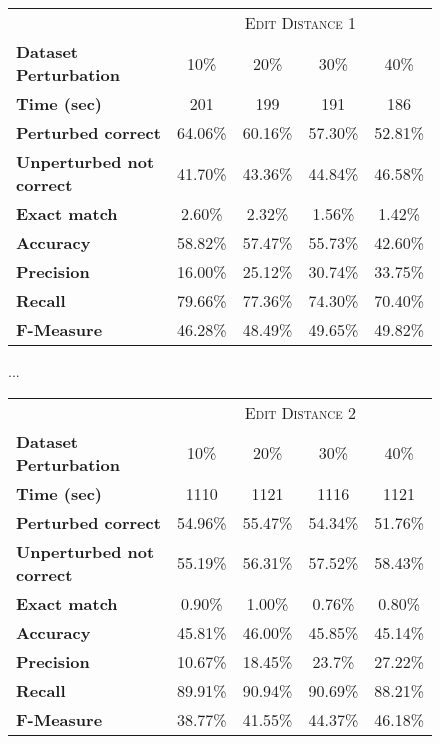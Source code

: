 \begin{figure}[H]
	\centering
	\begin{tabular}{lcccc}
		\toprule
		&\multicolumn{4}{c}{\textsc{Edit Distance 1}} \\
		\textbf{Dataset Perturbation} & \num{10}\%& \num{20}\% & \num{30}\%& \num{40}\%  \\
		\midrule
		\textbf{Time (sec)}							 &\num{201}			&\num{199}			& \num{191}			&\num{186} \\
		\textbf{Perturbed correct} 			   & \num{64,06}\% &\num{60,16}\%  & \num{57,30}\%	& \num{52,81}\% \\
		\textbf{Unperturbed not correct} &\num{41,70}\%	 &\num{43,36}\%  & \num{44,84}\% & \num{46,58}\% \\
		\textbf{Exact match} 					  &\num{2,60}\%	   &\num{2,32}\%	&\num{1,56}\%	&\num{1,42}\% \\
		\textbf{Accuracy} 							&\num{58,82}\%  &\num{57,47}\% &\num{55,73}\% &\num{42,60}\% \\
		\textbf{Precision}							 &\num{16,00}\% &\num{25,12}\% &\num{30,74}\%	&\num{33,75}\% \\
		\textbf{Recall}									&\num{79,66}\% &\num{77,36}\%&\num{74,30}\%	&\num{70,40}\%\\
		\textbf{F-Measure}						  &\num{46,28}\% &\num{48,49}\%&\num{49,65}\%	&\num{49,82}\%\\
		\bottomrule
	\end{tabular}
		\begin{center}
		...
		\end{center}
	\begin{tabular}{lcccc}
		\toprule
		&\multicolumn{4}{c}{\textsc{Edit Distance 2}} \\
		\textbf{Dataset Perturbation} & \num{10}\%& \num{20}\% & \num{30}\%& \num{40}\%  \\
		\midrule
		\textbf{Time (sec)}							 &\num{1110}		&\num{1121}	 	& \num{1116}		&\num{1121} \\
		\textbf{Perturbed correct} 			   & \num{54,96}\% &\num{55,47}\%  & \num{54,34}\%	& \num{51,76}\% \\
		\textbf{Unperturbed not correct} &\num{55,19}\%	 &\num{56,31}\%  & \num{57,52}\% & \num{58,43}\% \\
		\textbf{Exact match} 					  &\num{0,90}\%	   &\num{1,00}\%	&\num{0,76}\%	&\num{0,80}\% \\
		\textbf{Accuracy} 							&\num{45,81}\%  &\num{46,00}\% &\num{45,85}\% &\num{45,14}\% \\
		\textbf{Precision}							 &\num{10,67}\% &\num{18,45}\% &\num{23,7}\%	&\num{27,22}\% \\
		\textbf{Recall}									&\num{89,91}\% &\num{90,94}\%&\num{90,69}\%	&\num{88,21}\%\\
		\textbf{F-Measure}						  &\num{38,77}\% &\num{41,55}\%&\num{44,37}\%	&\num{46,18}\%\\
		\bottomrule
	\end{tabular}

	\label{tab:sentence-eval1}
\end{figure}


